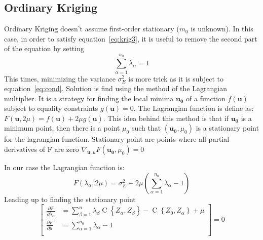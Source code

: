 \documentclass[twocolumn]{article}
\numberwithin{equation}{section}
\begin{document}
\subsection{Ordinary Kriging}
Ordinary Kriging doesn't assume first-order stationary ($m_0$ is unknown). In this case, in order to satisfy equation~\ref{eq:krig3}, it is useful to remove the second part of the equation by setting 
\begin{equation} \label{eq:cond}
	\sum_{\alpha=1}^{n_0} \lambda_\alpha=1
\end{equation}
This times, minimizing the variance $\sigma^2_E$ is more trick as it is subject to equation~\ref{eq:cond}. Solution is find using the method of the Lagrangian multiplier. It is a strategy for finding the local minima $\boldsymbol{u_0}$ of a function $f(\boldsymbol{u})$ subject to equality constraints $g(\boldsymbol{u})=0$. The Lagrangian function is define as: $ F(\boldsymbol{u},2\mu) = f(\boldsymbol{u}) + 2\mu g(\boldsymbol{u})$. This idea behind this method is that if $\boldsymbol{u_0}$ is a minimum point, then there is a point $\mu_0$ such that $(\boldsymbol{u_0}, \mu_0)$ is a stationary point for the lagrangian function. Stationary point are points where all partial derivatives of F are zero $ \nabla_{\boldsymbol{u},\mu} F(\boldsymbol{u_0}, \mu_0)=0 $

In our case the Lagrangian function is:
\begin{equation}
	F(\lambda_\alpha, 2\mu) = \sigma^2_E + 2\mu \left( \sum_{\alpha=1}^{n_0} \lambda_\alpha - 1\right)
\end{equation}
Leading up to finding the stationary point
\begin{equation} \label{eq:stationnary_pt}
	\left[
	\begin{array}{rl}
		\frac{\partial F}{\partial \lambda_\alpha } &=  \sum_{\beta=1}^n \lambda_\beta \operatorname{C}\left\{Z_\alpha,Z_\beta\right\}
		- \operatorname{C}\left\{Z_0, Z_\alpha \right\}  + \mu \\
		\frac{\partial F}{\partial \mu } &= \sum_{\alpha=1}^{n_0} \lambda_\alpha - 1\\
	\end{array}
	\right]=0
\end{equation}
\end{document}
